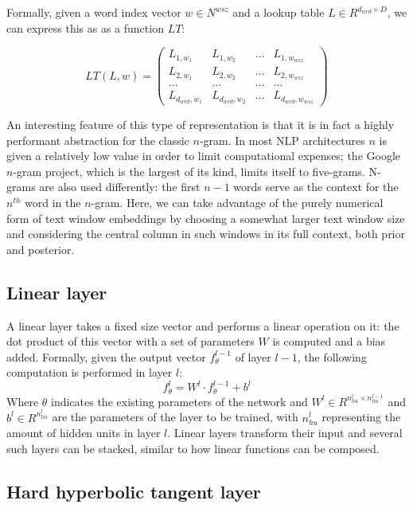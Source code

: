 Formally, given a word index vector $w \in N^{wsz}$ and a lookup table
$L \in R^{d_{wrd} \times D}$, we can express this as as a function
$LT$:

\begin{equation} \label{eq:ltmatrix} LT(L, w) =
\left( \begin{array}{cccc} L_{1,w_1} & L_{1,w_2} & \ldots &
L_{1,w_{wsz}} \\ L_{2,w_1} & L_{2,w_2} & \ldots & L_{2,w_{wsz}} \\
\ldots & \ldots & \ldots & \ldots \\ L_{d_{wrd},w_1} & L_{d_{wrd},w_2}
& \ldots & L_{d_{wrd},w_{wsz}} \end{array} \right)
\end{equation}

An interesting feature of this type of representation is that it is in
fact a highly performant abstraction for the classic $n$-gram. In most
NLP architectures $n$ is given a relatively low value in order to
limit computational expenses; the Google $n$-gram project, which is the
largest of its kind, limits itself to five-grams. N-grams are also
used differently: the first $n - 1$ words serve as the context for the
$n^{th}$ word in the $n$-gram. Here, we can take advantage of the
purely numerical form of text window embeddings by choosing a somewhat
larger text window size and considering the central column in such
windows in its full context, both prior and posterior.

\subsection{Linear layer}
A linear layer takes a fixed size vector and performs a linear
operation on it: the dot product of this vector with a set of
parameters $W$ is computed and a bias added. Formally, given the
output vector $f^{l-1}_\theta$ of layer $l-1$, the following
computation is performed in layer $l$:
\begin{equation}
  f^l_\theta = W^l \cdot f^{l-1}_\theta + b^l
\end{equation}
Where $\theta$ indicates the existing parameters of the network and
$W^l \in R^{n^l_{hu} \times n^{l-1}_{hu}} $ and $b^l \in R^{n^l_{hu}} $
are the parameters of the layer to be trained, with $n^l_{hu}$
representing the amount of hidden units in layer $l$. Linear layers
transform their input and several such layers can be stacked, similar
to how linear functions can be composed.

\subsection{Hard hyperbolic tangent layer}

